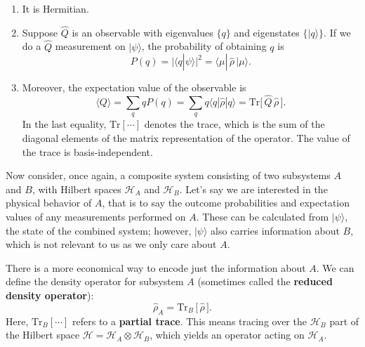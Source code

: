 \documentclass[pra,12pt]{revtex4-2}
\begin{document}
\begin{enumerate}
\item It is Hermitian.  

\item Suppose $\hat{Q}$ is an observable with eigenvalues $\{q\}$ and
  eigenstates $\{|q\rangle\}$.  If we do a $\hat{Q}$ measurement on
  $|\psi\rangle$, the probability of obtaining $q$ is
  \begin{equation}
    P(q) = \big|\langle q | \psi\rangle\big|^2 =
    \langle \mu |\, \hat{\rho}\, | \mu \rangle.
    \label{Pi_rho}
  \end{equation}

\item Moreover, the expectation value of the observable is
  \begin{equation}
    \langle Q\rangle
    = \sum_q q P(q)
    = \sum_q q \langle q | \hat{\rho}| q \rangle
    = \mathrm{Tr}\big[\,\hat{Q} \, \hat{\rho}\,\big].
    \label{Qexpt}
  \end{equation}
  In the last equality, $\mathrm{Tr}[\cdots]$ denotes the trace, which
  is the sum of the diagonal elements of the matrix representation of
  the operator.  The value of the trace is basis-independent.
\end{enumerate}

Now consider, once again, a composite system consisting of two
subsystems $A$ and $B$, with Hilbert spaces $\mathscr{H}_A$ and
$\mathscr{H}_B$.  Let's say we are interested in the physical behavior
of $A$, that is to say the outcome probabilities and expectation
values of any measurements performed on $A$.  These can be calculated
from $|\psi\rangle$, the state of the combined system; however,
$|\psi\rangle$ also carries information about $B$, which is not
relevant to us as we only care about $A$.

There is a more economical way to encode just the information about
$A$.  We can define the density operator for subsystem $A$ (sometimes
called the \textbf{reduced density operator}):
\begin{equation}
  \hat{\rho}_A = \mathrm{Tr}_B \,\big[\,\hat{\rho}\,\big].
  \label{rhoa_def}
\end{equation}
Here, $\mathrm{Tr}_B[\cdots]$ refers to a \textbf{partial trace}.
This means tracing over the $\mathscr{H}_B$ part of the Hilbert space
$\mathscr{H} = \mathscr{H}_A \otimes \mathscr{H}_B$, which yields an
operator acting on $\mathscr{H}_A$.
\end{document}

